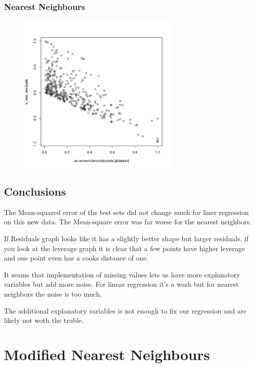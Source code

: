 \documentclass[12pt,a4paper]{article}
\begin{document}
\begin{singlespace}
\newpage
\subsubsection{Nearest Neighbours}
\vspace{-0.5cm}
\begin{figure}[h!]
    \centering
    \includegraphics[width=0.7\textwidth,trim= 0 0 20 30, clip]{Unk_NN_regression_residuals.pdf}
\end{figure}
\FloatBarrier

\subsection{Conclusions}
The Mean-squared error of the test sets did not change much for liner regression 
on this new data. The Mean-square error was far worse for the nearest neighbors.

If Residuals graph looks like it has a slightly better shape but larger residuals.
if you look at the leverage graph it is clear that a few points have higher 
leverage and one point even has a cooks distance of one.

It seams that implementation of missing values lets us have more 
explanatory variables but add more noise. For linear regression it's 
a wash but for nearest neighbors the noise is too much.

The additional explanatory variables is not enough to fix our regression
and are likely not woth the truble.



\section{Modified Nearest Neighbours}

\end{singlespace}
\end{document}
